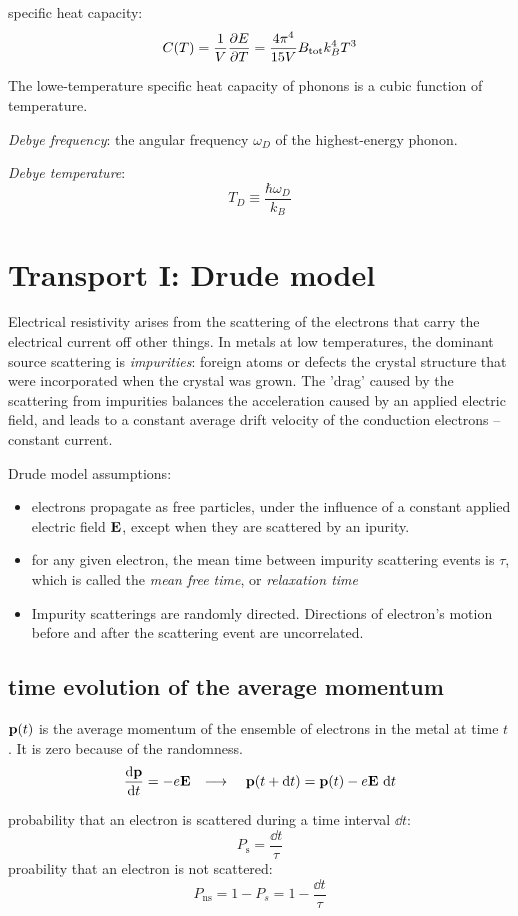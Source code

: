 \documentclass[10pt, a4paper, twocolumn]{article}
\newcommand{\deff}[1]{\par \noindent \textit{#1}: }
\newcommand{\arr}{\ensuremath{\longrightarrow\ }}
\begin{document}
specific heat capacity:
\[C(T) = \frac1V\pdv{E}{T}
=\frac{4\pi ^4}{15V}B_\mathrm{tot} k_B^4T^3\]

The lowe-temperature specific heat capacity of  phonons is a cubic function of temperature.

\deff{Debye frequency}
the angular frequency $\omega _D$ of the highest-energy phonon.

\deff{Debye temperature}
\[T_D\equiv\frac{\hbar\omega _D}{k_B}\]

\section{Transport I: Drude model}

Electrical resistivity arises from the scattering of the electrons that carry the electrical current off other things. In metals at low temperatures, the dominant source scattering is \emph{impurities}: foreign atoms or defects the crystal structure that were incorporated when the crystal was grown. The 'drag' caused by the scattering from impurities balances the acceleration caused by an applied electric field, and leads to a constant average drift velocity of the conduction electrons -- constant current.

Drude model assumptions:
\begin{itemize}
\item electrons propagate as free particles, under the influence of a constant applied electric field $\vb E$, except when they are scattered by an ipurity.
\item for any given electron, the mean time between impurity scattering events is $\tau$, which is called the \emph{mean free time}, or \emph{relaxation time}
\item Impurity scatterings are randomly directed. Directions of electron's motion before and after the scattering event are uncorrelated.
\end{itemize}

\subsection{time evolution of the average momentum}

$\vb p(t)$ is the average momentum of the ensemble of electrons in the metal at time $t$. It is zero because of the randomness.
\[\dv{\vb p}{t} = -e\vb E
\qq{\arr} \vb p (t+\dd t) = \vb p(t)-e\vb E\ \dd t\]

probability that an electron is scattered during a time interval $\dd t$:
\[P_\mathrm{s}=\frac{\dd t}{\tau}\]
proability that an electron is not scattered:
\[P_\mathrm{ns}=1-P_s =1-\frac{\dd t}{\tau}\]
\end{document}
